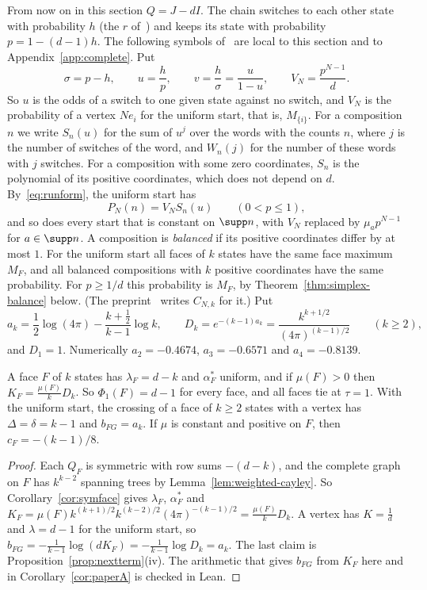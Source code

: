 From now on in this section $Q=J-dI$. The chain switches to each other state with
probability $h$ (the $r$ of~\cite{paperB}) and keeps its state with probability
$p=1-(d-1)h$. The
following symbols of~\cite{paperB} are local to this section and to
Appendix~\ref{app:complete}. Put
\[
\sigma=p-h,\qquad u=\frac hp,\qquad v=\frac h\sigma=\frac u{1-u},\qquad
V_N=\frac{p^{N-1}}d .
\]
So $u$ is the odds of a switch to one given state against no switch, and $V_N$ is the
probability of a vertex $Ne_i$ for the uniform start, that is, $M_{\{i\}}$. For a composition
$n$ we write $S_n(u)$ for the sum of $u^j$ over the words with the counts $n$, where $j$ is the
number of switches of the word, and $W_n(j)$ for the number of these words with $j$ switches. For a
composition with some zero coordinates, $S_n$ is the polynomial of its positive coordinates,
which does not depend on $d$. By~\eqref{eq:runform}, the uniform start has
\begin{equation}\label{eq:SnVN}
P_N(n)=V_NS_n(u)\qquad(0<p\le1),
\end{equation}
and so does every start that is constant on $\supp n$, with $V_N$ replaced by
$\mu_ap^{N-1}$ for $a\in\supp n$. A composition is \emph{balanced} if its positive coordinates
differ by at most $1$. For the uniform start all faces of $k$ states have the same face maximum
$M_F$, and all balanced compositions with $k$ positive coordinates have the same probability. For
$p\ge1/d$ this probability is $M_F$, by Theorem~\ref{thm:simplex-balance} below. (The preprint~\cite{paperB}
writes $C_{N,k}$ for it.) Put
\[
a_k=\frac12\log(4\pi)-\frac{k+\frac12}{k-1}\log k,\qquad
D_k=e^{-(k-1)a_k}=\frac{k^{k+1/2}}{(4\pi)^{(k-1)/2}}\qquad(k\ge2),
\]
and $D_1=1$. Numerically $a_2=-0.4674$, $a_3=-0.6571$ and $a_4=-0.8139$.

\begin{corollary}\label{cor:paperB}
A face $F$ of $k$ states has $\lambda_F=d-k$ and $\alpha^*_F$ uniform, and if $\mu(F)>0$ then
$K_F=\frac{\mu(F)}kD_k$. So $\Phi_1(F)=d-1$ for every face, and all faces tie at $\tau=1$. With
the uniform start, the crossing of a face of $k\ge2$ states with a vertex has
$\Delta=\delta=k-1$ and $b_{FG}=a_k$. If $\mu$ is constant and positive on $F$, then
$c_F=-(k-1)/8$.
\end{corollary}

\begin{proof}
Each $Q_F$ is symmetric with row sums $-(d-k)$, and the complete graph on $F$ has $k^{k-2}$
spanning trees by Lemma~\ref{lem:weighted-cayley}. So Corollary~\ref{cor:symface} gives
$\lambda_F$, $\alpha^*_F$ and $K_F=\mu(F)k^{(k+1)/2}k^{(k-2)/2}(4\pi)^{-(k-1)/2}=\frac{\mu(F)}kD_k$.
A vertex has $K=\frac1d$ and $\lambda=d-1$ for the uniform start, so
$b_{FG}=-\frac1{k-1}\log(dK_F)=-\frac1{k-1}\log D_k=a_k$. The last claim is
Proposition~\ref{prop:nextterm}(iv). The arithmetic that gives $b_{FG}$ from $K_F$ here and in
Corollary~\ref{cor:paperA} is checked in Lean.
\end{proof}

